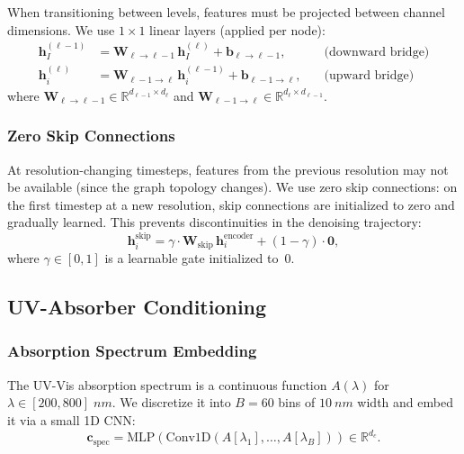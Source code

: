 \documentclass[12pt,a4paper]{article}
\providecommand{\R}{}
\renewcommand{\R}{\mathbb{R}}
\newcommand{\bh}{\bm{h}}
\begin{document}
When transitioning between levels, features must be projected between channel dimensions. We use $1 \times 1$ linear layers (applied per node):
\begin{align}
    \bh_I^{(\ell-1)} &= \bm{W}_{\ell \to \ell-1}\, \bh_I^{(\ell)} + \bm{b}_{\ell \to \ell-1}, \quad &\text{(downward bridge)} \label{eq:bridge_down} \\
    \bh_i^{(\ell)} &= \bm{W}_{\ell-1 \to \ell}\, \bh_i^{(\ell-1)} + \bm{b}_{\ell-1 \to \ell}, \quad &\text{(upward bridge)} \label{eq:bridge_up}
\end{align}
where $\bm{W}_{\ell \to \ell-1} \in \R^{d_{\ell-1} \times d_\ell}$ and $\bm{W}_{\ell-1 \to \ell} \in \R^{d_\ell \times d_{\ell-1}}$.

\subsubsection{Zero Skip Connections}

At resolution-changing timesteps, features from the previous resolution may not be available (since the graph topology changes). We use zero skip connections: on the first timestep at a new resolution, skip connections are initialized to zero and gradually learned. This prevents discontinuities in the denoising trajectory:
\begin{equation}\label{eq:zero_skip}
    \bh_i^{\text{skip}} = \gamma \cdot \bm{W}_{\text{skip}}\, \bh_i^{\text{encoder}} + (1 - \gamma) \cdot \bm{0},
\end{equation}
where $\gamma \in [0, 1]$ is a learnable gate initialized to~0.

\subsection{UV-Absorber Conditioning}\label{sec:conditioning}

\subsubsection{Absorption Spectrum Embedding}

The UV-Vis absorption spectrum is a continuous function $A(\lambda)$ for $\lambda \in [200, 800]\;\si{nm}$. We discretize it into $B = 60$ bins of $\SI{10}{nm}$ width and embed it via a small 1D CNN:
\begin{equation}\label{eq:spectrum_embed}
    \bm{c}_{\text{spec}} = \text{MLP}(\text{Conv1D}(A[\lambda_1], \ldots, A[\lambda_B])) \in \R^{d_c}.
\end{equation}
\end{document}
